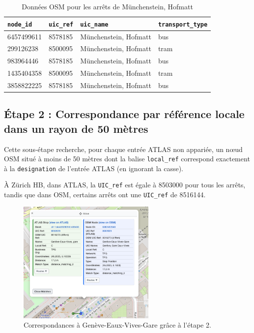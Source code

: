 \begin{table}[h]
\caption[Données OSM – Münchenstein, Hofmatt]{Données OSM pour les arrêts de Münchenstein, Hofmatt}
\label{tab:osm_data}
\centering
\begin{tabular}{l l l l}
\toprule
\texttt{node\_id} & \texttt{uic\_ref} & \texttt{uic\_name} & \texttt{transport\_type} \\
\midrule
6457499611 & 8578185 & Münchenstein, Hofmatt & bus \\
299126238 & 8500095 & Münchenstein, Hofmatt & tram \\
983964446 & 8578185 & Münchenstein, Hofmatt & bus \\
1435404358 & 8500095 & Münchenstein, Hofmatt & tram \\
3858822225 & 8578185 & Münchenstein, Hofmatt & bus \\
\bottomrule
\end{tabular}
\end{table}

\FloatBarrier

\subsection{Étape 2 : Correspondance par référence locale dans un rayon de 50 mètres}
Cette sous-étape recherche, pour chaque entrée ATLAS non appariée, un nœud OSM situé à moins de 50 mètres dont la balise \texttt{local\_ref} correspond exactement à la \texttt{designation} de l’entrée ATLAS (en ignorant la casse).

À Zürich HB, dans ATLAS, la \texttt{UIC\_ref} est égale à 8503000 pour tous les arrêts, tandis que dans OSM, certains arrêts ont une \texttt{UIC\_ref} de 8516144. 

\begin{figure}[h]
    \centering
    \includegraphics[height=6cm]{../figures/correspondances/distance_2.png}
    \caption[Correspondances distance étape 2)]{Correspondances à Genève-Eaux-Vives-Gare grâce à l'étape 2.}
    \label{fig:distance_2}
\end{figure}

